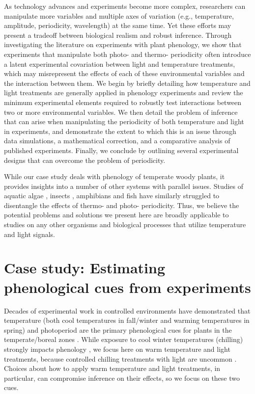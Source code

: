 \documentclass[11pt]{article}
\begin{document}
As technology advances and experiments become more complex, researchers can manipulate more variables and multiple axes of variation (e.g., temperature, amplitude, periodicity, wavelength) at the same time. Yet these efforts may present a tradeoff between biological realism and robust inference. Through investigating the literature on experiments with plant phenology, we show that experiments that manipulate both photo- and thermo- periodicity often introduce a latent experimental covariation between light and temperature treatments, which may misrepresent the effects of each of these environmental variables and the interaction between them. We begin by briefly detailing how temperature and light treatments are generally applied in phenology experiments and review the minimum experimental elements required to robustly test interactions between two or more environmental variables. We then detail the problem of inference that can arise when manipulating the periodicity of both temperature and light in experiments, and demonstrate the extent to which this is an issue through data simulations, a mathematical correction, and a comparative analysis of published experiments. Finally, we conclude by outlining several experimental designs that can overcome the problem of periodicity. 

While our case study deals with phenology of temperate woody plants, it provides insights into a number of other systems with parallel issues. Studies of aquatic algae \citep{XU2019167}, insects \citep{ANDUAGA201846}, amphibians \citep{WRIGHT200433} and fish \citep{Olemda_2009} have similarly struggled to disentangle the effects of thermo- and photo- periodicity.  Thus, we believe the potential problems and solutions we present here are broadly applicable to studies on any other organisms and biological processes that utilize temperature and light signals. 

\section*{Case study: Estimating phenological cues from experiments}
Decades of experimental work in controlled environments have demonstrated that temperature (both cool temperatures in fall/winter and warming temperatures in spring) and photoperiod are the primary phenological cues for plants in the temperate/boreal zones \citep{Ettinger:2020aa}. While exposure to cool winter temperatures (chilling) strongly impacts phenology \citep{Laube2014}, we focus here on warm temperature and light treatments, because controlled chilling treatments with light are uncommon \citep{Wolkovich:2022ue}. Choices about how to apply warm temperature and light treatments, in particular, can compromise inference on their effects, so we focus on these two cues.
\end{document}
